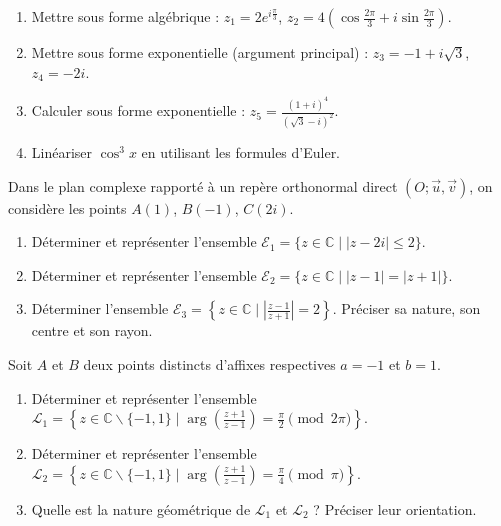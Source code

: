 \documentclass[11pt]{article}
\def\setminus{\mathbin{\backslash}}\let\smallsetminus\setminus
\begin{document}
\begin{exercice}
\begin{enumerate}
    \item Mettre sous forme algébrique : $z_1 = 2e^{i\frac{\pi}{3}}$, \quad $z_2 = 4\left(\cos\frac{2\pi}{3} + i\sin\frac{2\pi}{3}\right)$.
    \item Mettre sous forme exponentielle (argument principal) : $z_3 = -1 + i\sqrt{3}$, \quad $z_4 = -2i$.
    \item Calculer sous forme exponentielle : $z_5 = \frac{(1+i)^4}{(\sqrt{3}-i)^2}$.
    \item Linéariser $\cos^3 x$ en utilisant les formules d'Euler.
\end{enumerate}
\end{exercice}

\begin{exercice}
Dans le plan complexe rapporté à un repère orthonormal direct $(O; \vec{u}, \vec{v})$, on considère les points $A(1)$, $B(-1)$, $C(2i)$.
\begin{enumerate}
    \item Déterminer et représenter l'ensemble $\mathcal{E}_1 = \{z \in \mathbb{C} \mid |z - 2i| \leq 2\}$.
    \item Déterminer et représenter l'ensemble $\mathcal{E}_2 = \{z \in \mathbb{C} \mid |z - 1| = |z + 1|\}$.
    \item Déterminer l'ensemble $\mathcal{E}_3 = \left\{z \in \mathbb{C} \mid \left|\frac{z-1}{z+1}\right| = 2\right\}$. Préciser sa nature, son centre et son rayon.
\end{enumerate}
\end{exercice}

\begin{exercice}
Soit $A$ et $B$ deux points distincts d'affixes respectives $a = -1$ et $b = 1$.
\begin{enumerate}
    \item Déterminer et représenter l'ensemble $\mathcal{L}_1 = \left\{z \in \mathbb{C}\setminus\{-1, 1\} \mid \arg\left(\frac{z+1}{z-1}\right) = \frac{\pi}{2} \pmod{2\pi}\right\}$.
    \item Déterminer et représenter l'ensemble $\mathcal{L}_2 = \left\{z \in \mathbb{C}\setminus\{-1, 1\} \mid \arg\left(\frac{z+1}{z-1}\right) = \frac{\pi}{4} \pmod{\pi}\right\}$.
    \item Quelle est la nature géométrique de $\mathcal{L}_1$ et $\mathcal{L}_2$ ? Préciser leur orientation.
\end{enumerate}
\end{exercice}
\end{document}
